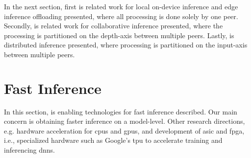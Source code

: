 In the next section, first is related work for local on-device inference and edge inference offloading presented, where all processing is done solely by one peer. Secondly, is related work for collaborative inference presented, where the processing is partitioned on the depth-axis between multiple peers. Lastly, is distributed inference presented, where processing is partitioned on the input-axis between multiple peers. 
\section{Fast Inference} \label{sec:ei-fast-inference}
In this section, is enabling technologies for fast inference described. Our main concern is obtaining faster inference on a model-level. Other research directions, e.g. hardware acceleration for \gls{cpu}s and \gls{gpu}s, and development of \gls{asic} and \gls{fpga}, i.e., specialized hardware such as Google's \gls{tpu} to accelerate training and inferencing \gls{dnn}s. 

